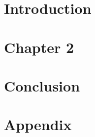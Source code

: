 \providecommand{\main}{.}






{\hypersetup{hidelinks}
	\tableofcontents  %
}

\chapter{Introduction}


\chapter{Chapter 2}


\chapter{Conclusion}


\appendix
\chapter{Appendix}




